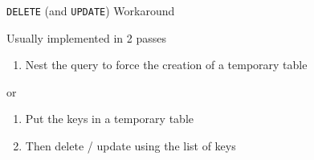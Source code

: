 \documentclass[aspectratio=169]{beamer}
\begin{document}
%
%
%
%
%
%
%
%
%

\begin{frame}{\texttt{DELETE} (and \texttt{UPDATE}) Workaround}

Usually implemented in 2 passes
\begin{enumerate}
\item Nest the query to force the creation of a temporary table
\end{enumerate}
or
\begin{enumerate}
\item Put the keys in a temporary table
\item Then delete / update using the list of keys
\end{enumerate}

\end{frame}
\end{document}
